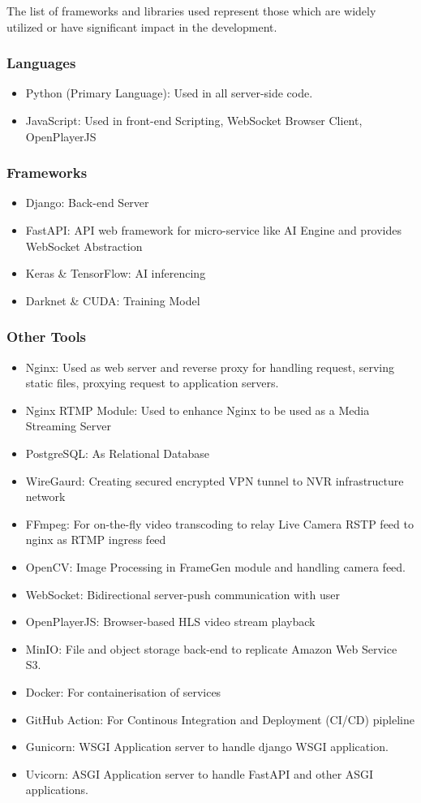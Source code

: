 The list of frameworks and libraries used represent those which are widely utilized or have significant impact in the development.

\subsubsection*{Languages}
\begin{itemize}
	\item Python (Primary Language): Used in all server-side code.
	\item JavaScript: Used in front-end Scripting, WebSocket Browser Client, OpenPlayerJS
\end{itemize}

\subsubsection*{Frameworks}
\begin{itemize}
	\item Django: Back-end Server
	\item FastAPI: API web framework for micro-service like AI Engine and provides WebSocket Abstraction
	\item Keras \& TensorFlow: AI inferencing
	\item Darknet \& CUDA: Training Model
\end{itemize}

\subsubsection*{Other Tools}
\begin{itemize}
	\item Nginx: Used as web server and reverse proxy for handling request, serving static files, proxying request to application servers.
	\item Nginx RTMP Module: Used to enhance Nginx to be used as a Media Streaming Server
	\item PostgreSQL: As Relational Database
	\item WireGaurd: Creating secured encrypted VPN tunnel to NVR infrastructure network
	\item FFmpeg: For on-the-fly video transcoding to relay Live Camera RSTP feed to nginx as RTMP ingress feed
	\item OpenCV: Image Processing in FrameGen module and handling camera feed.
	\item WebSocket: Bidirectional server-push communication with user
	\item OpenPlayerJS: Browser-based HLS video stream playback
	\item MinIO: File and object storage back-end to replicate Amazon Web Service S3.
	\item Docker: For containerisation of services
	\item GitHub Action: For Continous Integration and Deployment (CI/CD) pipleline
	\item Gunicorn: WSGI Application server to handle django WSGI application.
	\item Uvicorn: ASGI Application server to handle FastAPI and other ASGI applications. 
\end{itemize}


